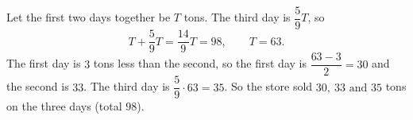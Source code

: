 Let the first two days together be $T$ tons. The third day is $\dfrac{5}{9}T$, so
\[T+\dfrac{5}{9}T=\dfrac{14}{9}T=98,\qquad T=63 .\]
The first day is $3$ tons less than the second, so the first day is $\dfrac{63-3}{2}=30$ and the second is $33$. The third day is $\dfrac{5}{9}\cdot63=35$. So the store sold $\boxed{30,\ 33\text{ and }35}$ tons on the three days (total $98$).
